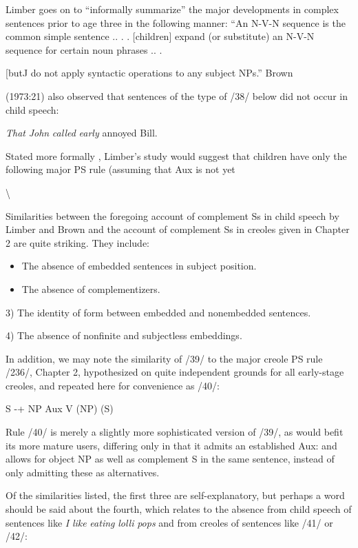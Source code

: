 Limber goes on to ``informally summarize'' the major develop\-ments in complex sentences prior to age three in the following manner: ``An N-V-N sequence is the common simple sentence .. . . [children] expand (or substitute) an N-V-N sequence for certain noun phrases .. .

[butJ do not apply syntactic operations to any subject NPs.'' Brown

(1973:21) also observed that sentences of the type of /38/ below did not occur in child speech:

\ea\label{ex:38}
 \textit{That} \textit{John} \textit{called} \textit{early} annoyed Bill.
\glt
\z

Stated more formally , Limber's study would suggest that children have only the following major PS rule (assuming that Aux is not yet

{\textbackslash}

Similarities between the foregoing account of complement Ss in child speech by Limber and Brown and the account of complement Ss in creoles given in Chapter 2 are quite striking. They include:

\begin{itemize}
\item The absence of embedded sentences in subject position.
\item The absence of complementizers.
\end{itemize}

3) The identity of form between embedded and nonembedded sentences.

4) The absence of nonfinite and subjectless embeddings.

In addition, we may note the similarity of /39/ to the major creole PS rule /236/, Chapter 2, hypothesized on quite independent grounds for all early-stage creoles, and repeated here for convenience as /40/:

\ea\label{ex:40}
 S {}-+ NP Aux V (NP) (S)
\glt
\z

Rule /40/ is merely a slightly more sophisticated version of /39/, as would befit its more mature users, differing only in that it admits an established Aux: and allows for object NP as well as complement S in the same sentence, instead of only admitting these as alternatives.

Of the similarities listed, the first three are self-explanatory, but perhaps a word should be said about the fourth, which relates to the absence from child speech of sentences like \textit{I} \textit{like} \textit{eating} \textit{lolli\-} \textit{pops} and from creoles of sentences like /41/ or /42/:

